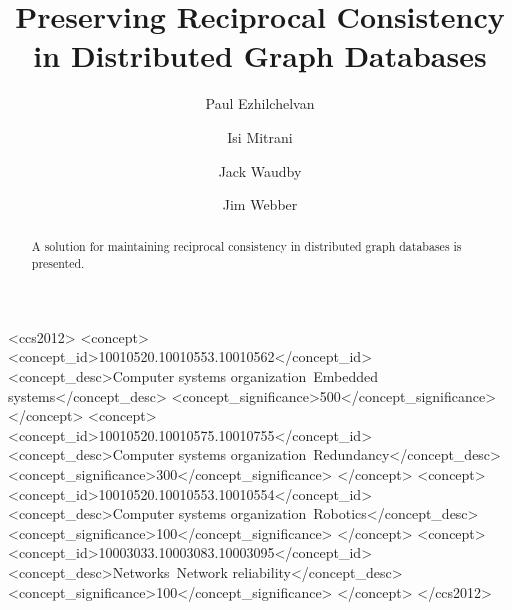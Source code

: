 \documentclass[sigplan,screen]{acmart}
\begin{document}
\title{Preserving Reciprocal Consistency in Distributed Graph Databases}

\author{Paul Ezhilchelvan}

\author{Isi Mitrani}

\author{Jack Waudby}

\author{Jim Webber}



\renewcommand{\shortauthors}{Ezhilchelvan, et al.}

\begin{abstract}
  A solution for maintaining reciprocal consistency in distributed graph databases is presented.
\end{abstract}

\begin{CCSXML}
<ccs2012>
 <concept>
  <concept_id>10010520.10010553.10010562</concept_id>
  <concept_desc>Computer systems organization~Embedded systems</concept_desc>
  <concept_significance>500</concept_significance>
 </concept>
 <concept>
  <concept_id>10010520.10010575.10010755</concept_id>
  <concept_desc>Computer systems organization~Redundancy</concept_desc>
  <concept_significance>300</concept_significance>
 </concept>
 <concept>
  <concept_id>10010520.10010553.10010554</concept_id>
  <concept_desc>Computer systems organization~Robotics</concept_desc>
  <concept_significance>100</concept_significance>
 </concept>
 <concept>
  <concept_id>10003033.10003083.10003095</concept_id>
  <concept_desc>Networks~Network reliability</concept_desc>
  <concept_significance>100</concept_significance>
 </concept>
</ccs2012>
\end{CCSXML}
\end{document}
